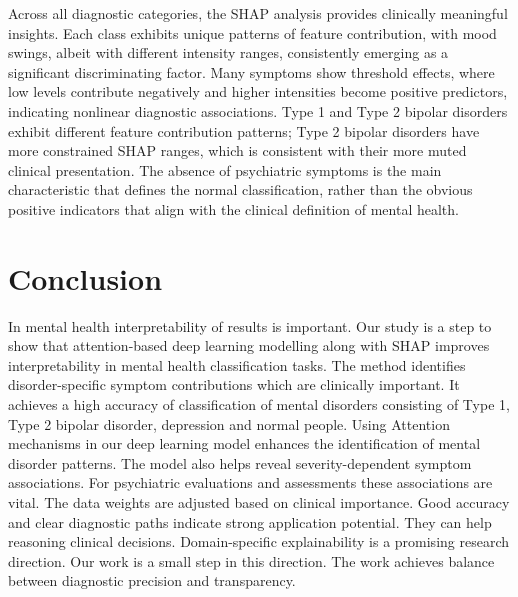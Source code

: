 \documentclass[conference]{IEEEtran}
\begin{document}
Across all diagnostic categories, the SHAP analysis provides clinically meaningful insights. Each class exhibits unique patterns of feature contribution, with mood swings, albeit with different intensity ranges, consistently emerging as a significant discriminating factor. Many symptoms show threshold effects, where low levels contribute negatively and higher intensities become positive predictors, indicating nonlinear diagnostic associations. Type 1 and Type 2 bipolar disorders exhibit different feature contribution patterns; Type 2 bipolar disorders have more constrained SHAP ranges, which is consistent with their more muted clinical presentation. The absence of psychiatric symptoms is the main characteristic that defines the normal classification, rather than the obvious positive indicators that align with the clinical definition of mental health.

\section{Conclusion}

In mental health interpretability of results is important. Our study is a step to show that attention-based deep learning modelling along with SHAP improves interpretability in mental health classification tasks. The method identifies disorder-specific symptom contributions which are clinically important. It achieves a high accuracy of classification of mental disorders consisting of Type 1, Type 2 bipolar disorder, depression and normal people. Using Attention mechanisms in our deep learning model enhances the identification of mental disorder patterns. The model also helps reveal severity-dependent symptom associations. For psychiatric evaluations and assessments these associations are vital. The data weights are adjusted based on clinical importance. Good accuracy and clear diagnostic paths indicate strong application potential. They can help reasoning clinical decisions. Domain-specific explainability is a promising research direction. Our work is a small step in this direction. The work achieves balance between diagnostic precision and transparency.
\end{document}

